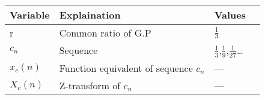 \begin{table}[ht]
    \begin{tabular}{ | >{\centering\arraybackslash}m{2cm} | >{\centering\arraybackslash}m{3cm} | >{\centering\arraybackslash}m{2cm} | @{}m{0pt}@{} }
    \hline
    Variable & Explaination & Values &\\[10pt]
    \hline
    r & Common ratio of G.P & $\frac{1}{3}$ &\\[10pt]
    \hline
    $c_n$ & Sequence & $\frac{1}{3}$,$\frac{1}{9}$,$\frac{1}{27}$\dots &\\[10pt]
    \hline
    $x_c(n)$ & Function equivalent of sequence $c_n$ & --- &\\[10pt]
    \hline 
    $X_c(n)$ & Z-transform of $c_n$ & --- &\\[10pt]
    \hline 
    \end{tabular}
    \begin{center}
    \end{center}
\end{table}
